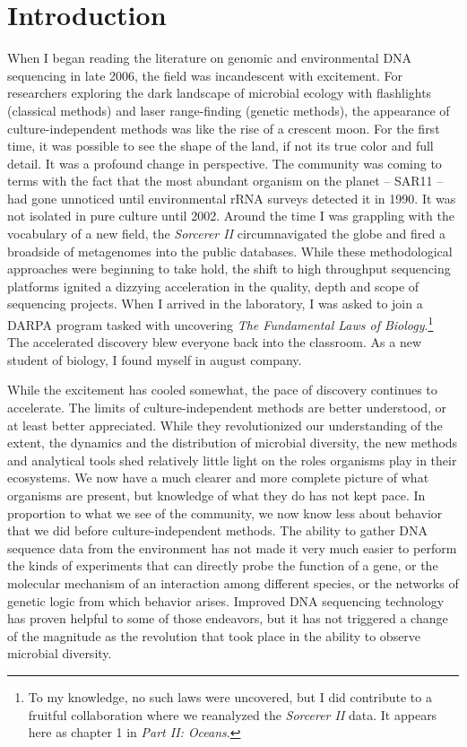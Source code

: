 \section*{Introduction}

When I began reading the literature on genomic and environmental DNA sequencing in late 2006, the field was incandescent with excitement. For researchers exploring the dark landscape of microbial ecology with flashlights (classical methods) and laser range-finding (genetic methods), the appearance of culture-independent methods was like the rise of a crescent moon. For the first time, it was possible to see the shape of the land, if not its true color and full detail. It was a profound change in perspective. The community was coming to terms with the fact that the most abundant organism on the planet -- SAR11 -- had gone unnoticed until environmental rRNA surveys detected it in 1990. \cite{giovannoni1990genetic, morris2002sar11} It was not isolated in pure culture until 2002. \cite{rappe2002cultivation} Around the time I was grappling with the vocabulary of a new field, the {\em Sorcerer II} circumnavigated the globe and fired a broadside of metagenomes into the public databases. \cite{yooseph2007sorcerer, rusch2007sorcerer, williamson2008sorcerer} While these methodological approaches were beginning to take hold, the shift to high throughput sequencing platforms ignited a dizzying acceleration in the quality, depth and scope of sequencing projects. When I arrived in the laboratory, I was asked to join a DARPA program tasked with uncovering {\em The Fundamental Laws of Biology}.\footnote{To my knowledge, no such laws were uncovered, but I did contribute to a fruitful collaboration where we reanalyzed the {\em Sorcerer II} data. It appears here as chapter 1 in {\em Part II: Oceans}.} The accelerated discovery blew everyone back into the classroom. As a new student of biology, I found myself in august company.

While the excitement has cooled somewhat, the pace of discovery continues to accelerate. The limits of culture-independent methods are better understood, or at least better appreciated. While they revolutionized our understanding of the extent, the dynamics and the distribution of microbial diversity, the new methods and analytical tools shed relatively little light on the roles organisms play in their ecosystems. We now have a much clearer and more complete picture of what organisms are present, but knowledge of what they do has not kept pace. In proportion to what we see of the community, we now know less about behavior that we did before culture-independent methods. The ability to gather DNA sequence data from the environment has not made it very much easier to perform the kinds of experiments that can directly probe the function of a gene, or the molecular mechanism of an interaction among different species, or the networks of genetic logic from which behavior arises. Improved DNA sequencing technology has proven helpful to some of those endeavors, but it has not triggered a change of the magnitude as the revolution that took place in the ability to observe microbial diversity.

